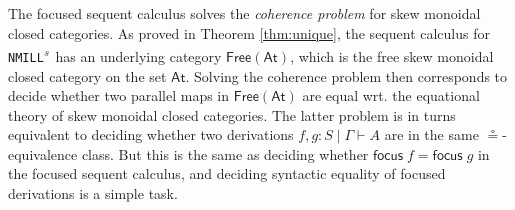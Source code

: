 \documentclass[submission,copyright,creativecommons]{eptcs}
\theoremstyle{definition}
\newcommand{\NMILL}{\texttt{NMILL}}
\newcommand{\SkNMILL}{\NMILL\textsuperscript{\textit{s}}}
\newcommand{\FSkMCC}{\textsf{Free}}
\begin{document}
The focused sequent calculus solves the \emph{coherence problem} for skew monoidal closed categories.
As proved in Theorem \ref{thm:unique}, the sequent calculus for \SkNMILL\ has an underlying category $\FSkMCC(\mathsf{At})$, which is the free skew monoidal closed category on the set $\mathsf{At}$. Solving the coherence problem then corresponds to decide whether two parallel maps in $\FSkMCC(\mathsf{At})$ are equal wrt. the equational theory of skew monoidal closed categories. The latter problem is in turns equivalent to deciding whether two derivations $f,g : S \mid \Gamma \vdash A$ are in the same $\circeq$-equivalence class. But this is the same as deciding whether $\mathsf{focus}\;f = \mathsf{focus}\;g$ in the focused sequent calculus, and deciding syntactic equality of focused derivations is a simple task.


\end{document}
